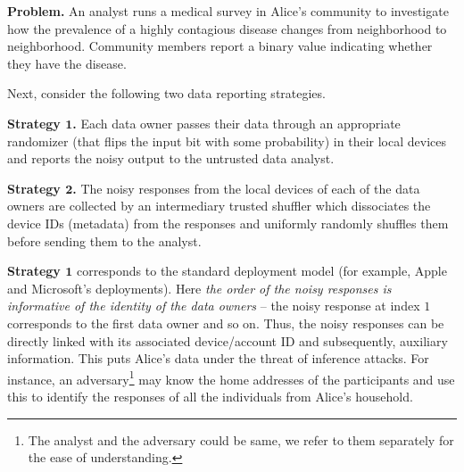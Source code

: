 \begin{tcolorbox}\vspace{-0.25cm}
\textbf{Problem.} An analyst runs a medical survey in Alice's community to investigate how the prevalence of a highly contagious disease changes from neighborhood to neighborhood. Community members report a binary value indicating whether they have the disease.  \vspace{-0.2cm}
\end{tcolorbox}\vspace{-0.1cm}
Next, consider the following two data reporting strategies. \vspace{-0.1cm}
\begin{tcolorbox}\vspace{-0.2cm} \textbf{Strategy $\mathbf{1}$.} Each data owner passes their data through an appropriate randomizer (that flips the input bit with some probability) in their local devices and reports the noisy output to the untrusted data analyst. 
\vspace{-0.2cm}
\end{tcolorbox}\vspace{-0.1cm}
\begin{tcolorbox}\vspace{-0.2cm} \textbf{Strategy $\mathbf{2}$.}  The noisy responses from the local devices of each of the data owners %
are collected by an intermediary trusted shuffler which dissociates the device IDs (metadata) from the responses and  uniformly randomly shuffles them before sending them to the analyst.\vspace{-0.2cm}
\end{tcolorbox}\vspace{-0.1cm}
\textbf{Strategy $\mathbf{1}$} corresponds to the standard \ldp deployment model (for example, Apple and Microsoft's deployments). Here \textit{the order of the noisy responses is informative of the identity of the data owners} -- the noisy response at index $1$ corresponds to the first data owner and so on. Thus, the noisy responses can be directly linked with its associated device/account ID and subsequently, auxiliary information. This puts Alice's data under the threat of inference attacks.
For instance, an adversary\footnote{The analyst and the adversary could be same, we refer to them separately for the ease of understanding.} may know the home addresses of the participants and use this to identify the responses of all the individuals from Alice's household.  
